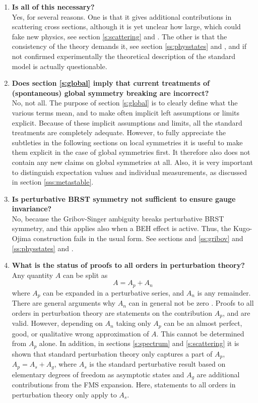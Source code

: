 \documentclass[final,twoside,12pt]{article}
\newcommand*{\no}{\noindent}
\newcommand*{\be}{\begin{equation}}
\newcommand*{\ee}{\end{equation}}
\newcommand*{\nn}{\nonumber}
\newcommand*{\1}{1\!\!\!\bot}
\begin{document}
\begin{enumerate}
 
 \item {\bf Is all of this necessary?}\\
 Yes, for several reasons. One is that it gives additional contributions in scattering cross sections, although it is yet unclear how large, which could fake new physics, see section \ref{s:scattering} and \cite{Egger:2017tkd,Raubitzek:unpublished}. The other is that the consistency of the theory demands it, see section \ref{ss:physstates} and \cite{Frohlich:1980gj,Frohlich:1981yi}, and if not confirmed experimentally the theoretical description of the standard model is actually questionable.
 
 \item {\bf Does section \ref{s:global} imply that current treatments of (spontaneous) global symmetry breaking are incorrect?}\\
 No, not all. The purpose of section \ref{s:global} is to clearly define what the various terms mean, and to make often implicit left assumptions or limits explicit. Because of these implicit assumptions and limits, all the standard treatments are completely adequate. However, to fully appreciate the subtleties in the following sections on local symmetries it is useful to make them explicit in the case of global symmetries first. It therefore also does not contain any new claims on global symmetries at all. Also, it is very important to distinguish expectation values and individual measurements, as discussed in section \ref{sss:metastable}.
 
 \item\label{q2} {\bf Is perturbative BRST symmetry not sufficient to ensure gauge invariance?}\\
 No, because the Gribov-Singer ambiguity breaks perturbative BRST symmetry, and this applies also when a BEH effect is active. Thus, the Kugo-Ojima construction fails in the usual form. See sections and \ref{ss:gribov} and \ref{ss:physstates} and \cite{Fujikawa:1982ss,Lenz:2000zt}.
 
 \item {\bf What is the status of proofs to all orders in perturbation theory?}\\
 Any quantity $A$ can be split as
 \be
 A=A_p+A_n\nn
 \ee
 \no where $A_p$ can be expanded in a perturbative series, and $A_n$ is any remainder. There are general arguments why $A_n$ can in general not be zero \cite{Haag:1992hx}. Proofs to all orders in perturbation theory are statements on the contribution $A_p$, and are valid. However, depending on $A_n$ taking only $A_p$ can be an almost perfect, good, or qualitative wrong approximation of $A$. This cannot be determined from $A_p$ alone. In addition, in sections \ref{s:spectrum} and \ref{s:scattering} it is shown that standard perturbation theory only captures a part of $A_p$, $A_p=A_s+A_g$, where $A_s$ is the standard perturbative result based on elementary degrees of freedom as asymptotic states and $A_g$ are additional contributions from the FMS expansion. Here, statements to all orders in perturbation theory only apply to $A_s$.
 

\end{enumerate}
\end{document}

